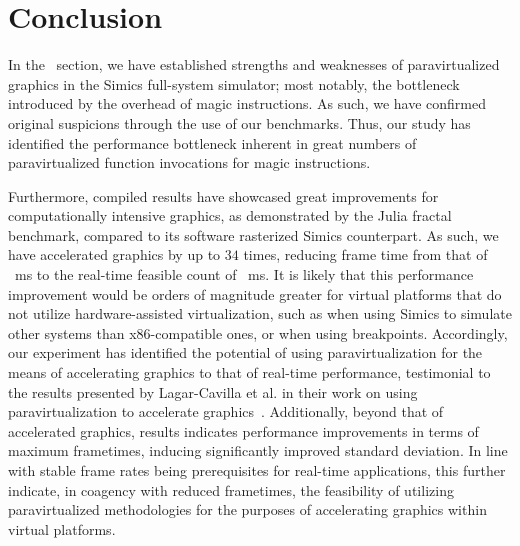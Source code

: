 
\section{Conclusion}
\label{sec:conclusion}
In the ~section, we have established strengths and weaknesses of paravirtualized graphics in the Simics full-system simulator; most notably, the bottleneck introduced by the overhead of magic instructions.
As such, we have confirmed original suspicions through the use of our benchmarks.
Thus, our study has identified the performance bottleneck inherent in great numbers of paravirtualized function invocations for magic instructions.

Furthermore, compiled results have showcased great improvements for computationally intensive graphics, as demonstrated by the Julia fractal benchmark, compared to its software rasterized Simics counterpart.
As such, we have accelerated graphics by up to $34$ times, reducing frame time from that of ~ms to the real-time feasible count of ~ms.
It is likely that this performance improvement would be orders of magnitude greater for virtual platforms that do not utilize hardware-assisted virtualization, such as when using Simics to simulate other systems than x86-compatible ones, or when using breakpoints.
Accordingly, our experiment has identified the potential of using paravirtualization for the means of accelerating graphics to that of real-time performance, testimonial to the results presented by Lagar-Cavilla et al. in their work on using paravirtualization to accelerate graphics~.
Additionally, beyond that of accelerated graphics, results indicates performance improvements in terms of maximum frametimes, inducing significantly improved standard deviation.
In line with stable frame rates being prerequisites for real-time applications, this further indicate, in coagency with reduced frametimes, the feasibility of utilizing paravirtualized methodologies for the purposes of accelerating graphics within virtual platforms.

